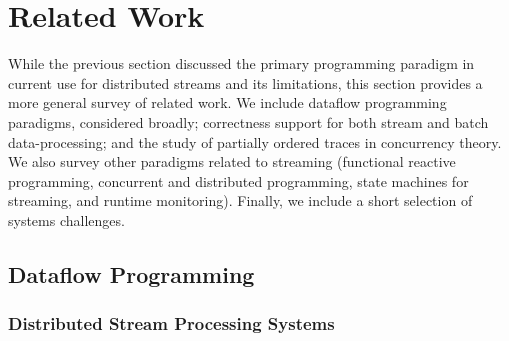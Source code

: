 \chapter{Related Work}
\label{cha:rw}


While the previous section discussed the primary programming paradigm in current use for distributed streams and its limitations, this section provides a more general survey of related work. We include dataflow programming paradigms, considered broadly; correctness support for both stream and batch data-processing; and the study of partially ordered traces in concurrency theory. We also survey other paradigms related to streaming (functional reactive programming, concurrent and distributed programming, state machines for streaming, and runtime monitoring). Finally, we include a short selection of systems challenges.

\section{Dataflow Programming}

\subsection{Distributed Stream Processing Systems}


